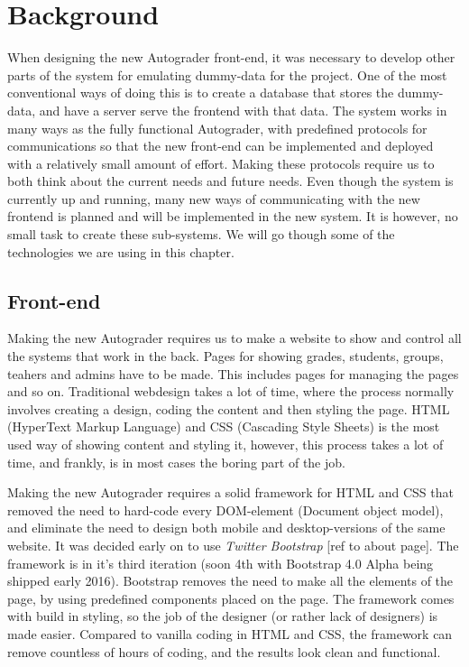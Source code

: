 \chapter{Background}

When designing the new Autograder front-end, it was necessary to develop other parts of the system for emulating dummy-data for the project. One of the most conventional ways of doing this is to create a database that stores the dummy-data, and have a server serve the frontend with that data. The system works in many ways as the fully functional Autograder, with predefined protocols for communications so that the new front-end can be implemented and deployed with a relatively small amount of effort. Making these protocols require us to both think about the current needs and future needs. Even though the system is currently up and running, many new ways of communicating with the new frontend is planned and will be implemented in the new system. It is however, no small task to create these sub-systems. We will go though some of the technologies we are using in this chapter.

\section{Front-end}
Making the new Autograder requires us to make a website to show and control all the systems that work in the back. Pages for showing grades, students, groups, teahers and admins have to be made. This includes pages for managing the pages and so on. Traditional webdesign takes a lot of time, where the process normally involves creating a design, coding the content and then styling the page. HTML (HyperText Markup Language) and CSS (Cascading Style Sheets) is the most used way of showing content and styling it, however, this process takes a lot of time, and frankly, is in most cases the boring part of the job.

Making the new Autograder requires a solid framework for HTML and CSS that removed the need to hard-code every DOM-element (Document object model), and eliminate the need to design both mobile and desktop-versions of the same website. It was decided early on to use \textit{Twitter Bootstrap} [ref to about page]. The framework is in it's third iteration (soon 4th with Bootstrap 4.0 Alpha being shipped early 2016). Bootstrap removes the need to make all the elements of the page, by using predefined components placed on the page. The framework comes with build in styling, so the job of the designer (or rather lack of designers) is made easier. Compared to vanilla coding in HTML and CSS, the framework can remove countless of hours of coding, and the results look clean and functional.

